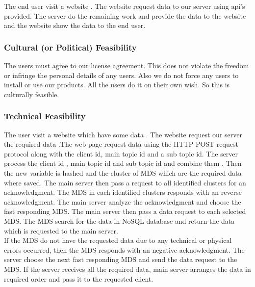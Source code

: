 \documentclass[12pt, a4paper]{article}
\begin{document}
\vspace{5mm}
The end user visit a website . The website request data to our server using api’s provided. The server do the remaining work and provide the data to the website and the website show the data to the end user.
  
  \vspace{5mm}
\subsubsection{Cultural (or Political) Feasibility}

\vspace{5mm}
The users must agree to our license agreement. This does not violate the freedom or infringe the personal details of any users. Also we do not force any users to install or use our products.
All the users do it on their own wish. So this is culturally feasible.

\vspace{5mm}
\subsubsection{Technical Feasibility}

\vspace{5mm}
The user visit a website which have some data . The website request our server the required data .The web page request data using the HTTP POST request protocol along with the client id, main topic id and a sub topic id. The server process the client id , main topic id and sub topic id and combine them . Then the new variable  is hashed and the cluster of MDS which are the required data where saved. The main server then pass a request to all identified clusters for an acknowledgment. The MDS in each identified clusters responds with an reverse acknowledgment. The main server analyze the acknowledgment and choose the fast responding MDS. The main server then pass a data request to each selected MDS. The MDS search for the data in NoSQL database and return the data which is requested to the main server.
\\

\hspace{5mm}If the MDS do not have the requested data due to any technical or physical errors occurred, then the MDS responds with an negative acknowledgment. The server choose the next fast responding MDS and send the data request to the MDS.  If the server receives all the required data, main server arranges the data in required order and pass it to the requested client. 
\end{document}
